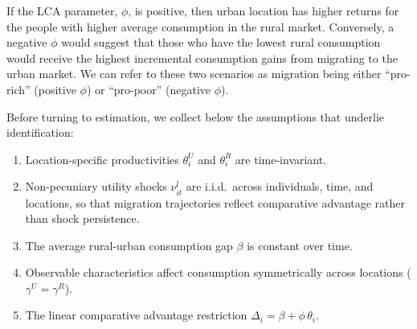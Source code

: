 If the LCA parameter, $\phi$, is positive, then urban location has higher returns for the people with higher average consumption in the rural market.
Conversely, a negative $\phi$ would suggest that those who have the lowest rural consumption would receive the highest incremental consumption gains from migrating to the urban market.
We can refer to these two scenarios as migration being either ``pro-rich'' (positive $\phi$) or ``pro-poor'' (negative $\phi$).
 




Before turning to estimation, we collect below the assumptions that underlie identification:
\begin{enumerate}[label=\textup{(A\arabic*)},leftmargin=*,itemsep=2pt]
    \item Location-specific productivities $\theta_i^U$ and $\theta_i^R$ are time-invariant.
    \item Non-pecuniary utility shocks $\nu_{it}^l$ are i.i.d.\ across individuals, time, and locations, so that migration trajectories reflect comparative advantage rather than shock persistence.
    \item The average rural-urban consumption gap $\beta$ is constant over time.
    \item Observable characteristics affect consumption symmetrically across locations ($\gamma^U = \gamma^R$).
    \item The linear comparative advantage restriction $\Delta_i = \beta + \phi\,\theta_i$.
\end{enumerate}


